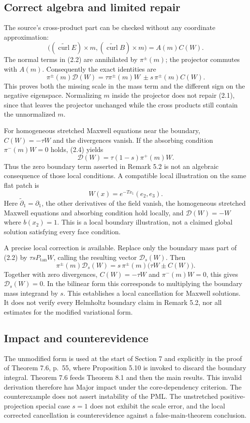 \documentclass[10pt]{article}
\begin{document}
\subsection*{Correct algebra and limited repair}
The source’s cross-product part can be checked without any coordinate approximation: \[\bigl((\widetilde{\operatorname{curl}}E)\times m,(\widetilde{\operatorname{curl}}B)\times m\bigr)=A(m)C(W).\] The normal terms in (2.2) are annihilated by \(\pi^\pm(m)\); the projector commutes with \(A(m)\). Consequently the exact identities are \[\boxed{\ \pi^\pm(m)\mathcal D(W)
       =\tau\pi^\pm(m)W\ \pm s\,\pi^\pm(m)C(W).\ }
 \tag{2.4}\] This proves both the missing scale in the mass term and the different sign on the negative eigenspace. Normalizing \(m\) inside the projector does not repair (2.1), since that leaves the projector unchanged while the cross products still contain the unnormalized \(m\).\par
For homogeneous stretched Maxwell equations near the boundary, \(C(W)=-\tau W\) and the divergences vanish. If the absorbing condition \(\pi^-(m)W=0\) holds, (2.4) yields \[\mathcal D(W)=\tau(1-s)\pi^+(m)W.
 \tag{2.5}\] Thus the zero boundary term asserted in Remark 5.2 is not an algebraic consequence of those local conditions. A compatible local illustration on the same flat patch is \[W(x)=e^{-Tx_1}(e_2,e_3).\] Here \(\widetilde\partial_1=\partial_1\), the other derivatives of the field vanish, the homogeneous stretched Maxwell equations and absorbing condition hold locally, and \(\mathcal D(W)=-W\) where \(b(x_2)=1\). This is a local boundary illustration, not a claimed global solution satisfying every face condition.\par
A precise local correction is available. Replace only the boundary mass part of (2.2) by \(\tau sP_{\mathrm{tan}}W\), calling the resulting vector \(\mathcal D_s(W)\). Then \[\pi^\pm(m)\mathcal D_s(W)=s\,\pi^\pm(m)\bigl(\tau W\pm C(W)\bigr).\] Together with zero divergences, \(C(W)=-\tau W\) and \(\pi^-(m)W=0\), this gives \(\mathcal D_s(W)=0\). In the bilinear form this corresponds to multiplying the boundary mass integrand by \(s\). This establishes a local cancellation for Maxwell solutions. It does not verify every Helmholtz boundary claim in Remark 5.2, nor all estimates for the modified variational form.\par
\subsection*{Impact and counterevidence}
The unmodified form is used at the start of Section 7 and explicitly in the proof of Theorem 7.6, p. 55, where Proposition 5.10 is invoked to discard the boundary integral. Theorem 7.6 feeds Theorem 8.1 and then the main results. This invalid derivation therefore has Major impact under the core-dependency criterion. The counterexample does not assert instability of the PML. The unstretched positive-projection special case \(s=1\) does not exhibit the scale error, and the local corrected cancellation is counterevidence against a false-main-theorem conclusion.\par
\end{document}
